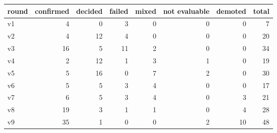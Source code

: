 \begin{tabular}{lrrrrrrr}
\toprule round & confirmed & decided & failed & mixed & not evaluable & demoted & total \\ \midrule
v1 & 4 & 0 & 3 & 0 & 0 & 0 & 7 \\
v2 & 4 & 12 & 4 & 0 & 0 & 0 & 20 \\
v3 & 16 & 5 & 11 & 2 & 0 & 0 & 34 \\
v4 & 2 & 12 & 1 & 3 & 1 & 0 & 19 \\
v5 & 5 & 16 & 0 & 7 & 2 & 0 & 30 \\
v6 & 5 & 5 & 3 & 4 & 0 & 0 & 17 \\
v7 & 6 & 5 & 3 & 4 & 0 & 3 & 21 \\
v8 & 19 & 3 & 1 & 1 & 0 & 4 & 28 \\
v9 & 35 & 1 & 0 & 0 & 2 & 10 & 48 \\
\bottomrule
\end{tabular}
